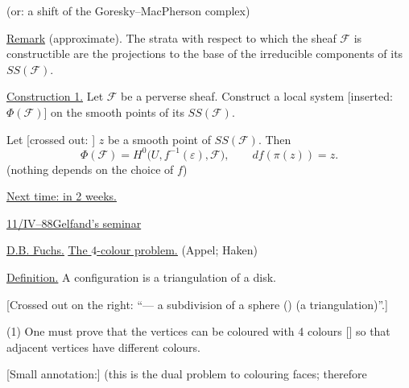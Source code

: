 (or: a shift of the Goresky--MacPherson complex)

\underline{Remark} (approximate).
The strata with respect to which the sheaf $\mathcal{F}$ is constructible
are the projections to the base of the irreducible components of its $SS(\mathcal{F})$.

\underline{Construction 1.}
Let $\mathcal{F}$ be a perverse sheaf.
Construct a local system [inserted: $\Phi(\mathcal{F})$]
on the smooth points of its $SS(\mathcal{F})$.

Let [crossed out: ]
$z$ be a smooth point of $SS(\mathcal{F})$.
Then
\begin{equation*}
\Phi(\mathcal{F})=
H^{0}\bigl(U,f^{-1}(\varepsilon),\mathcal{F}\bigr),
\qquad df(\pi(z))=z. \tag{11}
\end{equation*}
(nothing depends on the choice of $f$)

\underline{Next time: in 2 weeks.}


\underline{11/IV--88}\quad \underline{Gelfand's seminar}

\underline{\underline{D.B. Fuchs.}}\quad
\underline{\underline{The $4$-colour problem.}}\quad
(Appel; Haken)

\underline{Definition.} A configuration is a triangulation of a disk.

[Crossed out on the right: “--- a subdivision of a sphere
()
(a triangulation)”.]




(1) One must prove that the vertices can be coloured with 4 colours
[]
so that adjacent vertices have different colours.

[Small annotation:] (this is the dual problem to colouring faces; therefore

